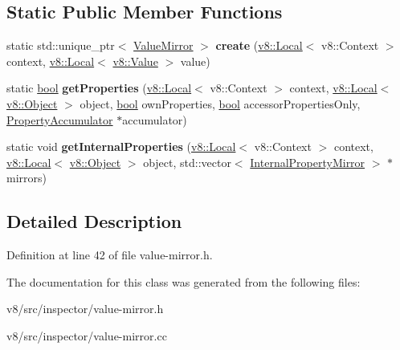 \subsection*{Static Public Member Functions}
\begin{DoxyCompactItemize}
\item 
\mbox{\label{classv8__inspector_1_1ValueMirror_a0ac9f5a0c2335f79c93d00f1c6d1adf8}} 
static std\+::unique\+\_\+ptr$<$ \mbox{\hyperlink{classv8__inspector_1_1ValueMirror}{Value\+Mirror}} $>$ {\bfseries create} (\mbox{\hyperlink{classv8_1_1Local}{v8\+::\+Local}}$<$ v8\+::\+Context $>$ context, \mbox{\hyperlink{classv8_1_1Local}{v8\+::\+Local}}$<$ \mbox{\hyperlink{classv8_1_1Value}{v8\+::\+Value}} $>$ value)
\item 
\mbox{\label{classv8__inspector_1_1ValueMirror_aa77d4981aca8a87c2d0e1f39deeb99e0}} 
static \mbox{\hyperlink{classbool}{bool}} {\bfseries get\+Properties} (\mbox{\hyperlink{classv8_1_1Local}{v8\+::\+Local}}$<$ v8\+::\+Context $>$ context, \mbox{\hyperlink{classv8_1_1Local}{v8\+::\+Local}}$<$ \mbox{\hyperlink{classv8_1_1Object}{v8\+::\+Object}} $>$ object, \mbox{\hyperlink{classbool}{bool}} own\+Properties, \mbox{\hyperlink{classbool}{bool}} accessor\+Properties\+Only, \mbox{\hyperlink{classv8__inspector_1_1ValueMirror_1_1PropertyAccumulator}{Property\+Accumulator}} $\ast$accumulator)
\item 
\mbox{\label{classv8__inspector_1_1ValueMirror_ab8ba9bf60183fb5587f21febe850be8e}} 
static void {\bfseries get\+Internal\+Properties} (\mbox{\hyperlink{classv8_1_1Local}{v8\+::\+Local}}$<$ v8\+::\+Context $>$ context, \mbox{\hyperlink{classv8_1_1Local}{v8\+::\+Local}}$<$ \mbox{\hyperlink{classv8_1_1Object}{v8\+::\+Object}} $>$ object, std\+::vector$<$ \mbox{\hyperlink{structv8__inspector_1_1InternalPropertyMirror}{Internal\+Property\+Mirror}} $>$ $\ast$mirrors)
\end{DoxyCompactItemize}


\subsection{Detailed Description}


Definition at line 42 of file value-\/mirror.\+h.



The documentation for this class was generated from the following files\+:\begin{DoxyCompactItemize}
\item 
v8/src/inspector/value-\/mirror.\+h\item 
v8/src/inspector/value-\/mirror.\+cc\end{DoxyCompactItemize}
